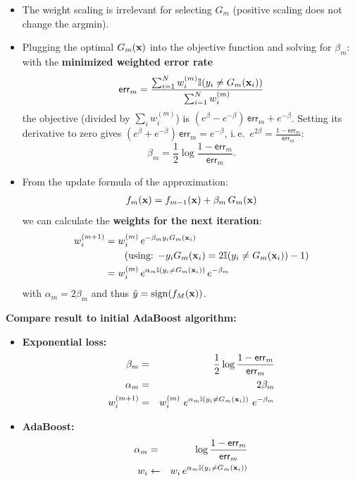   \begin{itemize}
    \item The weight scaling is irrelevant for selecting $G_m$ (positive scaling does not change the argmin).
    \item Plugging the optimal $G_m(\bm{\mathrm{x}})$ into the objective function and solving for $\beta_m$: with the \textbf{minimized weighted error rate}
      \begin{displaymath}
        \mathsf{err}_m = \frac{\sum_{i=1}^N w_i^{(m)} \mathbb I(y_i \neq G_m(\bm{\mathrm{x}}_i))}{\sum_{i=1}^N w_i^{(m)}}
      \end{displaymath}
      the objective (divided by $\sum_i w_i^{(m)}$) is $(e^{\beta}-e^{-\beta})\,\mathsf{err}_m+e^{-\beta}$. Setting its derivative to zero gives $(e^{\beta}+e^{-\beta})\,\mathsf{err}_m=e^{-\beta}$, i.\,e.\ $e^{2\beta}=\frac{1-\mathsf{err}_m}{\mathsf{err}_m}$:
      \begin{displaymath}
        \beta_m=\frac12\log\frac{1-\mathsf{err}_m}{\mathsf{err}_m}.
      \end{displaymath}
     \item From the update formula of the approximation:
      \begin{eqnarray*}
        f_m(\bm{\mathrm{x}}) = f_{m-1}(\bm{\mathrm{x}}) + \beta_m \, G_m(\bm{\mathrm{x}})
      \end{eqnarray*}
      we can calculate the \textbf{weights for the next iteration}:
      \begin{align*}
        w_i^{(m+1)}
          &= w_i^{(m)} \, e^{-\beta_m y_i G_m(\bm{\mathrm{x}}_i)} \\
          &\qquad \text{(using: $-y_i G_m(\bm{\mathrm{x}}_i) = 2 \mathbb I(y_i \neq G_m(\bm{\mathrm{x}}_i)) - 1$)} \\
          &= w_i^{(m)} \, e^{\alpha_m \mathbb I(y_i \neq G_m(\bm{\mathrm{x}}_i))} \, e^{-\beta_m}
      \end{align*}
      with $\alpha_m = 2 \beta_m$ and thus $\hat y = \operatorname{sign}(f_M(\bm{\mathrm{x}}))$.
  \end{itemize}
 

 \textbf {Compare result to initial AdaBoost algorithm:}

  \begin{itemize}
    \item\textbf {Exponential loss:}
      \begin{eqnarray*}
        \beta_m     &=& \frac{1}{2} \log \frac{1 - \mathsf{err}_m}{\mathsf{err}_m} \\
        \alpha_m    &=& 2 \beta_m \\
        w_i^{(m+1)} &=& w_i^{(m)} ~ e^{\alpha_m \mathbb I(y_i \neq G_m(\bm{\mathrm{x}}_i))} ~ e^{-\beta_m}
      \end{eqnarray*}
             
    \item\textbf {AdaBoost:}
      \begin{eqnarray*}
        \alpha_m &=&          \log \frac{1- \mathsf{err}_m}{\mathsf{err}_m} \\
        w_i      &\leftarrow& w_i \, e^{\alpha_m \mathbb I(y_i \neq G_m(\bm{\mathrm{x}}_i))}
      \end{eqnarray*}
  \end{itemize}
          


